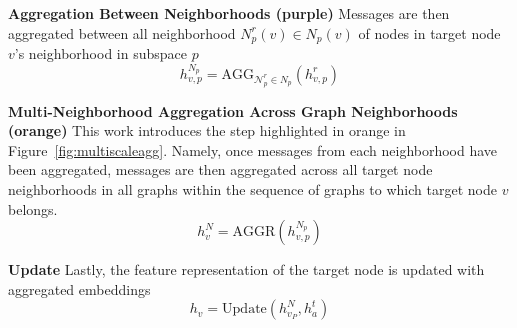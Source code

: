 \textbf{Aggregation Between Neighborhoods (purple)}
Messages are then aggregated between all neighborhood $N_{p}^r(v) \in N_{p}(v)$ of nodes in target node $v$'s neighborhood in subspace $p$
\[
h^{N_{p}}_{v,p} = \text{AGG}_{  \mathcal{N}_{p}^r  \in N_{p} } (h^r_{v,p}  )
\]

\textbf{Multi-Neighborhood Aggregation Across Graph Neighborhoods (orange)} This work introduces the step highlighted in orange in Figure~\ref{fig:multiscaleagg}. Namely, once messages from each neighborhood have been aggregated, messages are then aggregated across all target node neighborhoods in all graphs within the sequence of graphs to which target node $v$ belongs.
\[
h^{N}_{v} = \text{AGGR}(h^{N_{p}}_{v,p} )
\]

\textbf{Update}
Lastly, the feature representation of the target node is updated with aggregated embeddings
\[
h_v = \text{Update}(h^N_{v_P}, h^t_a)
\]

